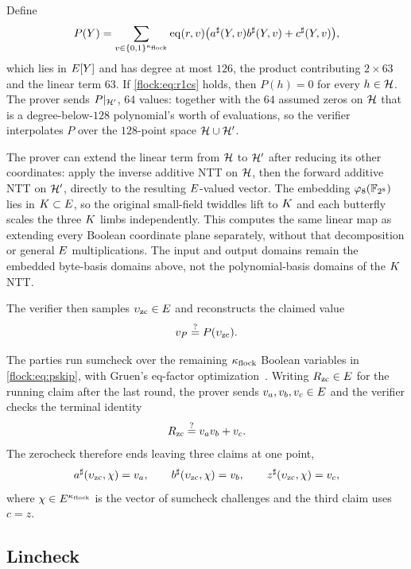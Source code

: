 Define
\begin{equation}\label{flock:eq:pskip}
P(Y)=\sum_{v\in\{0,1\}^{\kappa_{\mathrm{flock}}}}\operatorname{eq}(r,v)\bigl(a^{\sharp}(Y,v)b^{\sharp}(Y,v)+c^{\sharp}(Y,v)\bigr),
\end{equation}
which lies in $E[Y]$ and has degree at most $126$, the product contributing $2\times 63$ and the linear term $63$. If \eqref{flock:eq:r1cs} holds, then $P(h)=0$ for every $h\in\mathcal{H}$. The prover sends $P|_{\mathcal{H}'}$, $64$ values: together with the $64$ assumed zeros on $\mathcal{H}$ that is a degree-below-$128$ polynomial's worth of evaluations, so the verifier interpolates $P$ over the $128$-point space $\mathcal{H}\cup\mathcal{H}'$.

The prover can extend the linear term from $\mathcal{H}$ to $\mathcal{H}'$ after reducing its other coordinates: apply the inverse additive NTT on $\mathcal{H}$, then the forward additive NTT on $\mathcal{H}'$, directly to the resulting $E$-valued vector. The embedding $\varphi_{8}(\mathbb{F}_{2^8})$ lies in $K\subset E$, so the original small-field twiddles lift to $K$ and each butterfly scales the three $K$ limbs independently. This computes the same linear map as extending every Boolean coordinate plane separately, without that decomposition or general $E$ multiplications. The input and output domains remain the embedded byte-basis domains above, not the polynomial-basis domains of the $K$ NTT.

The verifier then samples $\upsilon_{\mathrm{zc}}\in E$ and reconstructs the claimed value
\[
v_P \stackrel{?}{=} P(\upsilon_{\mathrm{zc}}).
\]

The parties run sumcheck over the remaining $\kappa_{\mathrm{flock}}$ Boolean variables in \eqref{flock:eq:pskip}, with Gruen's eq-factor optimization~\cite{Gru24}. Writing $R_{\mathrm{zc}}\in E$ for the running claim after the last round, the prover sends $v_a,v_b,v_c\in E$ and the verifier checks the terminal identity
\begin{equation}\label{flock:eq:zc-terminal}
R_{\mathrm{zc}}\stackrel{?}{=} v_av_b+v_c.
\end{equation}
The zerocheck therefore ends leaving three claims at one point,
\begin{equation}\label{flock:eq:zc-claims}
a^{\sharp}(\upsilon_{\mathrm{zc}},\chi)=v_a,\qquad b^{\sharp}(\upsilon_{\mathrm{zc}},\chi)=v_b,\qquad z^{\sharp}(\upsilon_{\mathrm{zc}},\chi)=v_c,
\end{equation}
where $\chi\in E^{\kappa_{\mathrm{flock}}}$ is the vector of sumcheck challenges and the third claim uses $c=z$.

\subsection{Lincheck}\label{flock:lincheck}

